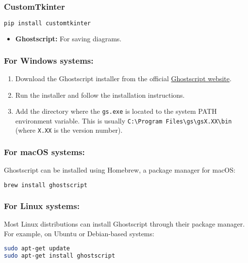 \subsubsection*{CustomTkinter}
\begin{lstlisting}[language=sh]
    pip install customtkinter
\end{lstlisting}

\begin{itemize}
\item \textbf{Ghostscript:} For saving diagrams.
\end{itemize}
\subsubsection*{For Windows systems:}
\begin{enumerate}
\item Download the Ghostscript installer from the official \href{https://www.ghostscript.com/download/gsdnld.html}{Ghostscript website}.
\item Run the installer and follow the installation instructions.
\item Add the directory where the \texttt{gs.exe} is located to the system PATH environment variable. This is usually \texttt{C:\textbackslash Program Files\textbackslash gs\textbackslash gsX.XX\textbackslash bin} (where \texttt{X.XX} is the version number).
\end{enumerate}

\subsubsection*{For macOS systems:}
Ghostscript can be installed using Homebrew, a package manager for macOS:
\begin{lstlisting}[language=sh]
brew install ghostscript
\end{lstlisting}

\subsubsection*{For Linux systems:}
Most Linux distributions can install Ghostscript through their package manager. For example, on Ubuntu or Debian-based systems:
\begin{lstlisting}[language=sh]
sudo apt-get update
sudo apt-get install ghostscript
\end{lstlisting}